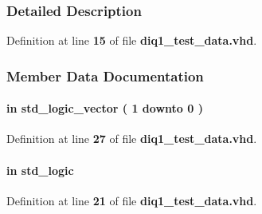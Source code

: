 \subsubsection{Detailed Description}


Definition at line {\bf 15} of file {\bf diq1\+\_\+test\+\_\+data.\+vhd}.



\subsubsection{Member Data Documentation}
\paragraph[{ch\+\_\+en}]{ {\bfseries \textcolor{keywordflow}{in}\textcolor{vhdlchar}{ }} {\bfseries \textcolor{comment}{std\+\_\+logic\+\_\+vector}\textcolor{vhdlchar}{ }\textcolor{vhdlchar}{(}\textcolor{vhdlchar}{ }\textcolor{vhdlchar}{ } \textcolor{vhdldigit}{1} \textcolor{vhdlchar}{ }\textcolor{keywordflow}{downto}\textcolor{vhdlchar}{ }\textcolor{vhdlchar}{ } \textcolor{vhdldigit}{0} \textcolor{vhdlchar}{ }\textcolor{vhdlchar}{)}\textcolor{vhdlchar}{ }} \hspace{0.3cm}{\ttfamily [Port]}}\label{classdiq1__test__data_a6494f316f504075c4ccf47146756d576}


Definition at line {\bf 27} of file {\bf diq1\+\_\+test\+\_\+data.\+vhd}.

\paragraph[{clk}]{ {\bfseries \textcolor{keywordflow}{in}\textcolor{vhdlchar}{ }} {\bfseries \textcolor{comment}{std\+\_\+logic}\textcolor{vhdlchar}{ }} \hspace{0.3cm}{\ttfamily [Port]}}\label{classdiq1__test__data_a4a4609c199d30b3adebbeb3a01276ec5}


Definition at line {\bf 21} of file {\bf diq1\+\_\+test\+\_\+data.\+vhd}.

